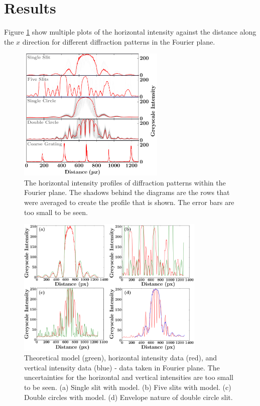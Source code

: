 \documentclass[twocolumn]{revtex4}
\begin{document}
\section{Results}
\vspace{-2ex}
Figure \ref{horizontal_profiles} show multiple plots of the horizontal intensity against the distance along the $x$ direction for different diffraction patterns in the Fourier plane.
\begin{figure}[!h]
\begin{center}
\includegraphics[width=7cm]{results/horizontal_intensity_profiles2}
\caption[]{The horizontal intensity profiles of diffraction patterns within the Fourier plane. The shadows behind the diagrams are the rows that were averaged to create the profile that is shown. The error bars are too small to be seen.}
\label{horizontal_profiles}
\end{center}
\end{figure}
\begin{figure}[!h]
\begin{center}
\includegraphics[width=9cm]{results/data_and_models2}
\caption[]{Theoretical model (green), horizontal intensity data (red), and vertical intensity data (blue) - data taken in Fourier plane. The uncertainties for the horizontal and vertical intensities are too small to be seen. (a) Single slit with model. (b) Five slits with model. (c) Double circles with model. (d) Envelope nature of double circle slit.}
\label{datamodels}
\end{center}
\end{figure}
\end{document}
